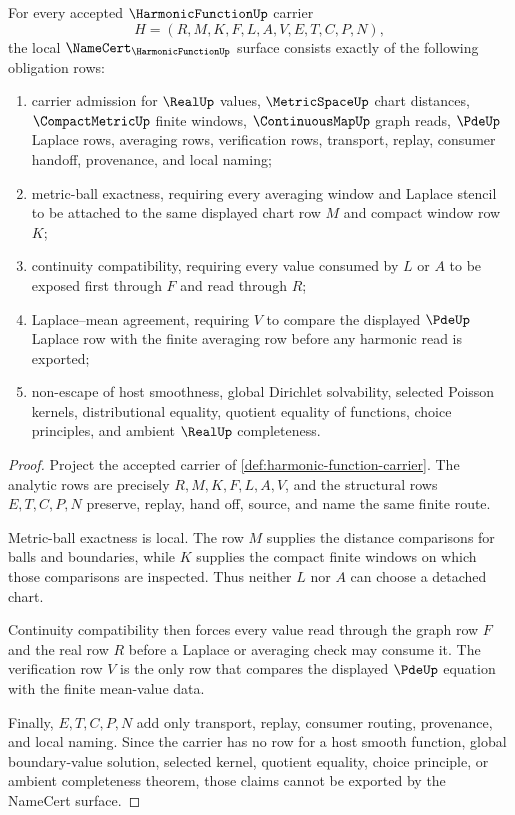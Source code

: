 \begin{theorem}
\label{thm:harmonic-function-namecert-obligations}
For every accepted $\HarmonicFunctionUp$ carrier
$$
H=(R,M,K,F,L,A,V,E,T,C,P,N),
$$
the local $\NameCert_{\HarmonicFunctionUp}$ surface consists exactly of the following obligation rows:
\begin{enumerate}
\item carrier admission for $\RealUp$ values, $\MetricSpaceUp$ chart distances, $\CompactMetricUp$ finite windows, $\ContinuousMapUp$ graph reads, $\PdeUp$ Laplace rows, averaging rows, verification rows, transport, replay, consumer handoff, provenance, and local naming;
\item metric-ball exactness, requiring every averaging window and Laplace stencil to be attached to the same displayed chart row $M$ and compact window row $K$;
\item continuity compatibility, requiring every value consumed by $L$ or $A$ to be exposed first through $F$ and read through $R$;
\item Laplace--mean agreement, requiring $V$ to compare the displayed $\PdeUp$ Laplace row with the finite averaging row before any harmonic read is exported;
\item non-escape of host smoothness, global Dirichlet solvability, selected Poisson kernels, distributional equality, quotient equality of functions, choice principles, and ambient $\RealUp$ completeness.
\end{enumerate}
\end{theorem}
\begin{proof}
Project the accepted carrier of \autoref{def:harmonic-function-carrier}. The analytic rows are precisely $R,M,K,F,L,A,V$, and the structural rows $E,T,C,P,N$ preserve, replay, hand off, source, and name the same finite route.

Metric-ball exactness is local. The row $M$ supplies the distance comparisons for balls and boundaries, while $K$ supplies the compact finite windows on which those comparisons are inspected. Thus neither $L$ nor $A$ can choose a detached chart.

Continuity compatibility then forces every value read through the graph row $F$ and the real row $R$ before a Laplace or averaging check may consume it. The verification row $V$ is the only row that compares the displayed $\PdeUp$ equation with the finite mean-value data.

Finally, $E,T,C,P,N$ add only transport, replay, consumer routing, provenance, and local naming. Since the carrier has no row for a host smooth function, global boundary-value solution, selected kernel, quotient equality, choice principle, or ambient completeness theorem, those claims cannot be exported by the NameCert surface.
\end{proof}

